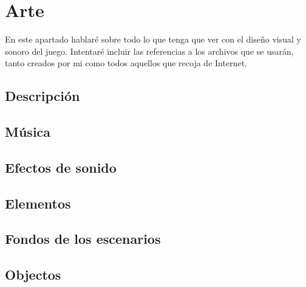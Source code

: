 \documentclass[12pt, spanish, a4paper]{article}
\begin{document}
	\lipsum[20]
	
	\section{Arte}
	
	En este apartado hablaré sobre todo lo que tenga que ver con el diseño visual y sonoro del juego. Intentaré incluir las referencias a los archivos que se usarán, tanto creados por mi como todos aquellos que recoja de Internet.
	
	\subsection{Descripción}
	
	\lipsum[22]
	
	\subsection{Música}
	
	\lipsum[23]
	
	\subsection{Efectos de sonido}
	
	\lipsum[24]
	
	\subsection{Elementos}
	
	\lipsum[25]
	
	\subsection{Fondos de los escenarios}
	
	\lipsum[26]
	
	\subsection{Objectos}
	
	\lipsum[27]
	
\end{document}
